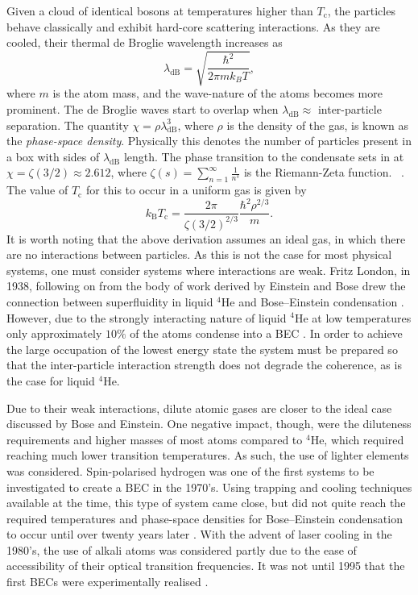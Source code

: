 Given a cloud of identical bosons at temperatures higher than $T_{\textrm{c}}$, the particles behave classically and exhibit hard-core scattering interactions. As they are cooled, their thermal de Broglie wavelength increases as
\begin{equation}
\lambda_{\textrm{dB}} = \sqrt{\frac{\hbar^2}{2\pi mk_{B}T}},
\end{equation}
where $m$ is the atom mass, and the wave-nature of the atoms becomes more prominent. The de Broglie waves start to overlap when $\lambda_{\textrm{dB}} \approx$ inter-particle separation. The quantity $\chi=\rho\lambda_{\textrm{dB}}^3$, where $\rho$ is the density of the gas, is known as the \emph{phase-space density}. Physically this denotes the number of particles present in a box with sides of $\lambda_{\textrm{dB}}$ length. The phase transition to the condensate sets in at $\chi = \zeta\left( 3 / 2 \right)\approx 2.612$, where $\zeta(s) = \displaystyle\sum\limits_{n=1}^{\infty}\frac{1}{n^s}$ is the Riemann-Zeta function. ~\cite{BK:Ueda_2010}. The value of $T_{\textrm{c}}$ for this to occur in a uniform gas is given by
\begin{equation}
k_{\textrm{B}}T_{\textrm{c}} = \frac{2\pi}{\zeta\left( 3 / 2 \right)^{2/3}}\frac{\hbar^2\rho^{2/3}}{m}.
\end{equation}
It is worth noting that the above derivation assumes an ideal gas, in which there are no interactions between particles. As this is not the case for most physical systems, one must consider systems where interactions are weak. Fritz London, in 1938, following on from the body of work derived by Einstein and Bose drew the connection between superfluidity in liquid $^4$He and Bose--Einstein condensation \cite[Chap.~1]{BK:Pitaevskii_Stringari_2003}. However, due to the strongly interacting nature of liquid $^4$He at low temperatures only approximately $10\%$ of the atoms condense into a BEC \cite{BEC:Penrose_pr_1956}. In order to achieve the large occupation of the lowest energy state the system must be prepared so that the inter-particle interaction strength does not degrade the coherence, as is the case for liquid $^4$He.

Due to their weak interactions, dilute atomic gases are closer to the ideal case discussed by Bose and Einstein. One negative impact, though, were the diluteness requirements and higher masses of most atoms compared to $^4$He, which required reaching much lower transition temperatures. As such, the use of lighter elements was considered. Spin-polarised hydrogen was one of the first systems to be investigated to create a BEC \cite{BEC:Kleppner_enfe_1998,BEC:Fried_prl_1998,BK:Pitaevskii_Stringari_2003} in the 1970's. Using trapping and cooling techniques available at the time, this type of system came close, but did not quite reach the required temperatures and phase-space densities for Bose--Einstein condensation to occur until over twenty years later \cite{BEC:Fried_prl_1998}. With the advent of laser cooling in the 1980's, the use of alkali atoms was considered partly due to the ease of accessibility of their optical transition frequencies. It was not until 1995 that the first BECs were experimentally realised \cite{BEC:Cornell_science_1995,BEC:Ketterle_prl_1995}.

